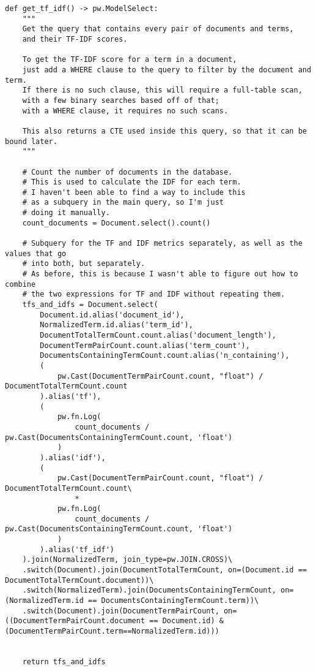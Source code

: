\documentclass[a4page]{article}
\begin{document}
\begin{verbatim}
def get_tf_idf() -> pw.ModelSelect:
    """
    Get the query that contains every pair of documents and terms,
    and their TF-IDF scores.

    To get the TF-IDF score for a term in a document,
    just add a WHERE clause to the query to filter by the document and term.
    If there is no such clause, this will require a full-table scan,
    with a few binary searches based off of that;
    with a WHERE clause, it requires no such scans.

    This also returns a CTE used inside this query, so that it can be bound later.
    """

    # Count the number of documents in the database.
    # This is used to calculate the IDF for each term.
    # I haven't been able to find a way to include this
    # as a subquery in the main query, so I'm just
    # doing it manually.
    count_documents = Document.select().count()

    # Subquery for the TF and IDF metrics separately, as well as the values that go
    # into both, but separately.
    # As before, this is because I wasn't able to figure out how to combine
    # the two expressions for TF and IDF without repeating them.
    tfs_and_idfs = Document.select(
        Document.id.alias('document_id'),
        NormalizedTerm.id.alias('term_id'),
        DocumentTotalTermCount.count.alias('document_length'),
        DocumentTermPairCount.count.alias('term_count'),
        DocumentsContainingTermCount.count.alias('n_containing'),
        (
            pw.Cast(DocumentTermPairCount.count, "float") / DocumentTotalTermCount.count
        ).alias('tf'),
        (
            pw.fn.Log(
                count_documents / pw.Cast(DocumentsContainingTermCount.count, 'float')
            )
        ).alias('idf'),
        (
            pw.Cast(DocumentTermPairCount.count, "float") / DocumentTotalTermCount.count\
                *
            pw.fn.Log(
                count_documents / pw.Cast(DocumentsContainingTermCount.count, 'float')
            )
        ).alias('tf_idf')
    ).join(NormalizedTerm, join_type=pw.JOIN.CROSS)\
    .switch(Document).join(DocumentTotalTermCount, on=(Document.id == DocumentTotalTermCount.document))\
    .switch(NormalizedTerm).join(DocumentsContainingTermCount, on=(NormalizedTerm.id == DocumentsContainingTermCount.term))\
    .switch(Document).join(DocumentTermPairCount, on=((DocumentTermPairCount.document == Document.id) & (DocumentTermPairCount.term==NormalizedTerm.id)))


    return tfs_and_idfs

\end{verbatim}
\end{document}
